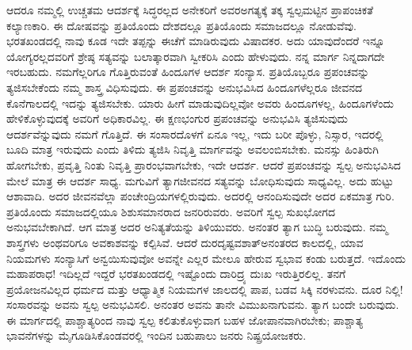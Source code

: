 ಆದರೂ ನಮ್ಮಲ್ಲಿ ಉಚ್ಚತಮ ಆದರ್ಶಕ್ಕೆ ಸಿದ್ಧರಲ್ಲದ ಅನೇಕರಿಗೆ ಅವರ\break ಅಗತ್ಯಕ್ಕೆ ತಕ್ಕ ಸ್ವಲ್ಪಮಟ್ಟಿನ ಪ್ರಾಪಂಚಿಕತೆ ಕಲ್ಯಾಣಕಾರಿ. ಈ ದೋಷವನ್ನು ಪ್ರತಿಯೊಂದು ದೇಶದಲ್ಲೂ ಪ್ರತಿಯೊಂದು ಸಮಾಜದಲ್ಲೂ ನೋಡುವೆವು. ಭರತಖಂಡದಲ್ಲಿ ನಾವು ಕೂಡ ಇದೇ ತಪ್ಪನ್ನು ಈಚೆಗೆ ಮಾಡಿರುವುದು ವಿಷಾದಕರ. ಅದು ಯಾವುದೆಂದರೆ ಇನ್ನೂ ಯೋಗ್ಯರಲ್ಲದವರಿಗೆ ಶ್ರೇಷ್ಠ ಸತ್ಯವನ್ನು ಬಲಾತ್ಕಾರವಾಗಿ ಸ್ವೀಕರಿಸಿ ಎಂದು ಹೇಳುವುದು. ನನ್ನ ಮಾರ್ಗ ನಿನ್ನದಾಗದೇ ಇರಬಹುದು. ನಮಗೆಲ್ಲರಿಗೂ ಗೊತ್ತಿರುವಂತೆ ಹಿಂದೂಗಳ ಆದರ್ಶ ಸಂನ್ಯಾಸ. ಪ್ರತಿಯೊಬ್ಬರೂ ಪ್ರಪಂಚವನ್ನು ತ್ಯಜಿಸಬೇಕೆಂದು ನಮ್ಮ ಶಾಸ್ತ್ರ ವಿಧಿಸುವುದು. ಈ ಪ್ರಪಂಚವನ್ನು ಅನುಭವಿಸಿದ ಹಿಂದೂಗಳೆಲ್ಲರೂ ಜೀವನದ ಕೊನೆಗಾಲದಲ್ಲಿ ಇದನ್ನು ತ್ಯಜಿಸಬೇಕು. ಯಾರು ಹೀಗೆ ಮಾಡುವುದಿಲ್ಲವೋ ಅವರು ಹಿಂದೂಗಳಲ್ಲ, ಹಿಂದೂಗಳೆಂದು ಹೇಳಿಕೊಳ್ಳುವುದಕ್ಕೆ ಅವರಿಗೆ ಅಧಿಕಾರವಿಲ್ಲ. ಈ ಕ್ಷಣಭಂಗುರ ಪ್ರಪಂಚವನ್ನು ಅನುಭವಿಸಿ ತ್ಯಜಿಸುವುದು ಆದರ್ಶವೆನ್ನುವುದು ನಮಗೆ ಗೊತ್ತಿದೆ. ಈ ಸಂಸಾರದೊಳಗೆ ಏನೂ ಇಲ್ಲ, ಇದು ಬರೀ ಪೊಳ್ಳು, ನಿಸ್ಸಾರ, ಇದರಲ್ಲಿ ಬೂದಿ ಮಾತ್ರ ಇರುವುದು ಎಂದು ತಿಳಿದು ತ್ಯಜಿಸಿ ನಿವೃತ್ತಿ ಮಾರ್ಗವನ್ನು ಅವಲಂಬಿಸಬೇಕು. ಮನಸ್ಸು ಹಿಂತಿರುಗಿ ಹೋಗಬೇಕು, ಪ್ರವೃತ್ತಿ ನಿಂತು ನಿವೃತ್ತಿ ಪ್ರಾರಂಭವಾಗಬೇಕು, ಇದೇ ಆದರ್ಶ. ಆದರೆ ಪ್ರಪಂಚವನ್ನು ಸ್ವಲ್ಪ ಅನುಭವಿಸಿದ ಮೇಲೆ ಮಾತ್ರ ಈ ಆದರ್ಶ ಸಾಧ್ಯ. ಮಗುವಿಗೆ ತ್ಯಾಗಜೀವನದ ಸತ್ಯವನ್ನು ಬೋಧಿಸುವುದು ಸಾಧ್ಯವಿಲ್ಲ. ಅದು ಹುಟ್ಟು ಆಶಾವಾದಿ. ಅದರ ಜೀವನವೆಲ್ಲಾ ಪಂಚೇಂದ್ರಿಯಗಳಲ್ಲಿರುವುದು. ಅದರಲ್ಲಿ ಆನಂದಿಸುವುದೇ ಅದರ ಏಕಮಾತ್ರ ಗುರಿ. ಪ್ರತಿಯೊಂದು ಸಮಾಜದಲ್ಲಿಯೂ ಶಿಶುಸಮಾನರಾದ ಜನರಿರುವರು. ಅವರಿಗೆ ಸ್ವಲ್ಪ ಸುಖಭೋಗದ ಅನುಭವಬೇಕಾಗಿದೆ. ಆಗ ಮಾತ್ರ ಅದರ ಅನಿತ್ಯತೆಯನ್ನು ತಿಳಿಯುವರು. ಅನಂತರ ತ್ಯಾಗ ಬುದ್ಧಿ ಬರುವುದು. ನಮ್ಮ ಶಾಸ್ತ್ರಗಳು ಅಂಥವರಿಗೂ ಅವಕಾಶವನ್ನು ಕಲ್ಪಿಸಿವೆ. ಆದರೆ ದುರದೃಷ್ಟವಶಾತ್​ ಅನಂತರದ ಕಾಲದಲ್ಲಿ, ಯಾವ ನಿಯಮಗಳು ಸಂನ್ಯಾಸಿಗೆ ಅನ್ವಯಿಸುವುವೋ ಅವನ್ನೇ ಎಲ್ಲರ ಮೇಲೂ ಹೇರುವ ಸ್ವಭಾವ ಕಂಡು ಬರುತ್ತದೆ. ಇದೊಂದು ಮಹಾಪರಾಧ! ಇದಿಲ್ಲದೆ ಇದ್ದರೆ ಭರತಖಂಡದಲ್ಲಿ ಇಷ್ಟೊಂದು ದಾರಿದ್ರ್ಯ ದುಃಖ ಇರುತ್ತಿರಲಿಲ್ಲ. ತನಗೆ ಪ್ರಯೋಜನವಿಲ್ಲದ ಧರ್ಮದ ಮತ್ತು ಆಧ್ಯಾತ್ಮಿಕ ನಿಯಮಗಳ ಜಾಲದಲ್ಲಿ ಪಾಪ, ಬಡವ ಸಿಕ್ಕಿ ನರಳುವನು. ದೂರ ನಿಲ್ಲಿ! ಸಂಸಾರವನ್ನು ಅವನು ಸ್ವಲ್ಪ ಅನುಭವಿಸಲಿ. ಅನಂತರ ಅವನು ತಾನೇ ವಿಮುಖನಾಗುವನು. ತ್ಯಾಗ ಬಂದೇ ಬರುವುದು. ಈ ಮಾರ್ಗದಲ್ಲಿ ಪಾಶ್ಚಾತ್ಯರಿಂದ ನಾವು ಸ್ವಲ್ಪ ಕಲಿತುಕೊಳ್ಳುವಾಗ ಬಹಳ ಜೋಪಾನವಾಗಿರಬೇಕು; ಪಾಶ್ಚಾತ್ಯ ಭಾವನೆಗಳನ್ನು ಮೈಗೂಡಿಸಿಕೊಂಡವರಲ್ಲಿ ಇಂದಿನ ಬಹುಪಾಲು ಜನರು ನಿಷ್ಪ್ರಯೋಜಕರು.

